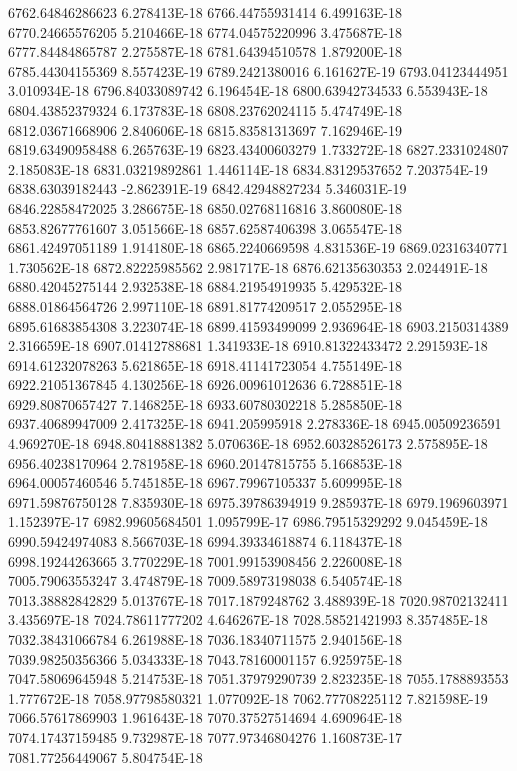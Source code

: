 6762.64846286623  6.278413E-18
6766.44755931414  6.499163E-18
6770.24665576205  5.210466E-18
6774.04575220996  3.475687E-18
6777.84484865787  2.275587E-18
6781.64394510578  1.879200E-18
6785.44304155369  8.557423E-19
6789.2421380016  6.161627E-19
6793.04123444951  3.010934E-18
6796.84033089742  6.196454E-18
6800.63942734533  6.553943E-18
6804.43852379324  6.173783E-18
6808.23762024115  5.474749E-18
6812.03671668906  2.840606E-18
6815.83581313697  7.162946E-19
6819.63490958488  6.265763E-19
6823.43400603279  1.733272E-18
6827.2331024807  2.185083E-18
6831.03219892861  1.446114E-18
6834.83129537652  7.203754E-19
6838.63039182443  -2.862391E-19
6842.42948827234  5.346031E-19
6846.22858472025  3.286675E-18
6850.02768116816  3.860080E-18
6853.82677761607  3.051566E-18
6857.62587406398  3.065547E-18
6861.42497051189  1.914180E-18
6865.2240669598  4.831536E-19
6869.02316340771  1.730562E-18
6872.82225985562  2.981717E-18
6876.62135630353  2.024491E-18
6880.42045275144  2.932538E-18
6884.21954919935  5.429532E-18
6888.01864564726  2.997110E-18
6891.81774209517  2.055295E-18
6895.61683854308  3.223074E-18
6899.41593499099  2.936964E-18
6903.2150314389  2.316659E-18
6907.01412788681  1.341933E-18
6910.81322433472  2.291593E-18
6914.61232078263  5.621865E-18
6918.41141723054  4.755149E-18
6922.21051367845  4.130256E-18
6926.00961012636  6.728851E-18
6929.80870657427  7.146825E-18
6933.60780302218  5.285850E-18
6937.40689947009  2.417325E-18
6941.205995918  2.278336E-18
6945.00509236591  4.969270E-18
6948.80418881382  5.070636E-18
6952.60328526173  2.575895E-18
6956.40238170964  2.781958E-18
6960.20147815755  5.166853E-18
6964.00057460546  5.745185E-18
6967.79967105337  5.609995E-18
6971.59876750128  7.835930E-18
6975.39786394919  9.285937E-18
6979.1969603971  1.152397E-17
6982.99605684501  1.095799E-17
6986.79515329292  9.045459E-18
6990.59424974083  8.566703E-18
6994.39334618874  6.118437E-18
6998.19244263665  3.770229E-18
7001.99153908456  2.226008E-18
7005.79063553247  3.474879E-18
7009.58973198038  6.540574E-18
7013.38882842829  5.013767E-18
7017.1879248762  3.488939E-18
7020.98702132411  3.435697E-18
7024.78611777202  4.646267E-18
7028.58521421993  8.357485E-18
7032.38431066784  6.261988E-18
7036.18340711575  2.940156E-18
7039.98250356366  5.034333E-18
7043.78160001157  6.925975E-18
7047.58069645948  5.214753E-18
7051.37979290739  2.823235E-18
7055.1788893553  1.777672E-18
7058.97798580321  1.077092E-18
7062.77708225112  7.821598E-19
7066.57617869903  1.961643E-18
7070.37527514694  4.690964E-18
7074.17437159485  9.732987E-18
7077.97346804276  1.160873E-17
7081.77256449067  5.804754E-18
